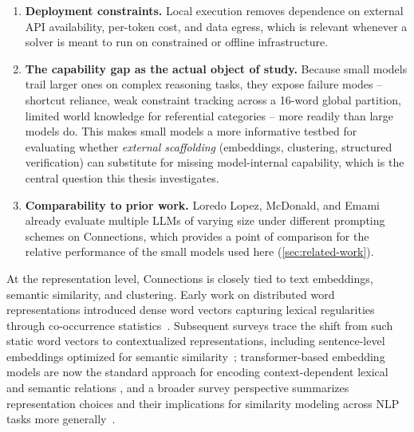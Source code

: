 \begin{enumerate}
  \item \textbf{Deployment constraints.} Local execution removes
  dependence on external API availability, per-token cost, and data
  egress, which is relevant whenever a solver is meant to run on
  constrained or offline infrastructure.
  \item \textbf{The capability gap as the actual object of study.}
  Because small models trail larger ones on complex reasoning tasks,
  they expose failure modes -- shortcut reliance, weak constraint
  tracking across a 16-word global partition, limited world knowledge for
  referential categories -- more readily than large models do. This makes
  small models a more informative testbed for evaluating whether
  \emph{external scaffolding} (embeddings, clustering, structured
  verification) can substitute for missing model-internal capability,
  which is the central question this thesis investigates.
  \item \textbf{Comparability to prior work.} Loredo Lopez, McDonald, and
  Emami~\cite{loredolopez2025} already evaluate multiple LLMs of varying
  size under different prompting schemes on Connections, which provides a
  point of comparison for the relative performance of the small models
  used here (\autoref{sec:related-work}).
\end{enumerate}


\label{sec:embeddings-clustering}

At the representation level, Connections is closely tied to text
embeddings, semantic similarity, and clustering. Early work on
distributed word representations introduced dense word vectors capturing
lexical regularities through co-occurrence statistics~\cite{mikolov2013}.
Subsequent surveys trace the shift from such static word vectors to
contextualized representations, including sentence-level embeddings
optimized for semantic similarity~\cite{chandrasekaran2021};
transformer-based embedding models are now the standard approach for
encoding context-dependent lexical and semantic relations
\cite{incitti2023}, and a broader survey perspective summarizes
representation choices and their implications for similarity modeling
across NLP tasks more generally~\cite{patil2023}.

